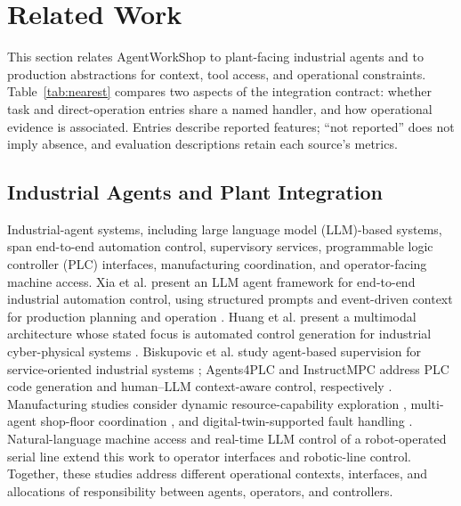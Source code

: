 \section{Related Work}
\label{sec:related}
This section relates AgentWorkShop to plant-facing industrial agents and to
production abstractions for context, tool access, and operational constraints.
Table~\ref{tab:nearest} compares two aspects of the integration contract:
whether task and direct-operation entries share a named handler, and how
operational evidence is associated. Entries describe reported features;
``not reported'' does not imply absence, and evaluation descriptions retain
each source's metrics.

\subsection{Industrial Agents and Plant Integration}
Industrial-agent systems, including large language model (LLM)-based systems,
span end-to-end automation control, supervisory
services, programmable logic controller (PLC) interfaces, manufacturing
coordination, and operator-facing machine access. Xia et al. present an
LLM agent framework for end-to-end industrial automation control, using
structured prompts and event-driven context for production planning and
operation \cite{xia2025control}. Huang et al. present a multimodal
architecture whose stated focus is automated control generation for
industrial cyber-physical systems \cite{huang2026made}. Biskupovic et al.
study agent-based supervision for service-oriented industrial systems
\cite{biskupovic2025supervision};
Agents4PLC and InstructMPC address PLC code generation and human--LLM
context-aware control, respectively
\cite{liu2026agents4plc,wu2025instructmpc}. Manufacturing studies consider
dynamic resource-capability exploration \cite{lim2025llmenabled}, multi-agent
shop-floor coordination \cite{zhao2026shopfloor}, and digital-twin-supported
fault handling \cite{gill2025llmdt}. Natural-language machine access
\cite{hofmann2025nlc} and real-time LLM control of a robot-operated serial
line \cite{waseem2026pretrained} extend this work to operator interfaces and
robotic-line control. Together, these studies address different operational
contexts, interfaces, and allocations of responsibility between agents,
operators, and controllers.

